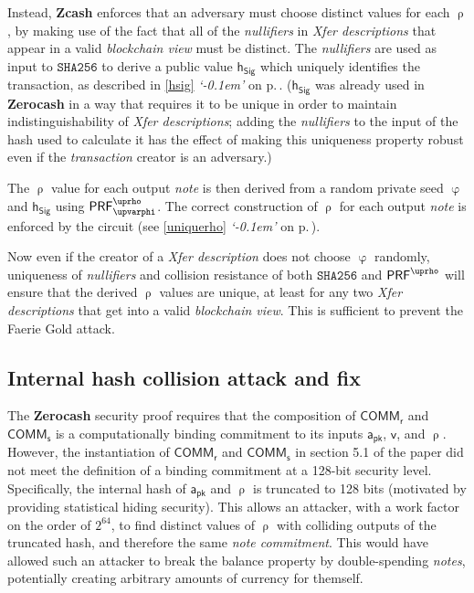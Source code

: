 \documentclass{article}
\newcommand{\crossref}[1]{\autoref{#1} \emph{`\nameref*{#1}\kern -0.1em'} on p.\,\pageref*{#1}}
\newcommand{\term}[1]{\textsl{#1}\xspace}
\newcommand{\termbf}[1]{\textbf{#1}\xspace}
\newcommand{\Zcash}{\termbf{Zcash}}
\newcommand{\Zerocash}{\termbf{Zerocash}}
\newcommand{\coin}{\term{note}}
\newcommand{\coins}{\term{notes}}
\newcommand{\coinCommitment}{\term{note commitment}}
\newcommand{\pourDescription}{\term{Xfer description}}
\newcommand{\pourDescriptions}{\term{Xfer descriptions}}
\newcommand{\transaction}{\term{transaction}}
\newcommand{\blockchainview}{\term{blockchain view}}
\newcommand{\serialNumbers}{\term{nullifiers}}
\newcommand{\FullHash}{\mathtt{SHA256}}
\newcommand{\AuthPublic}{\mathsf{a_{pk}}}
\newcommand{\Value}{\mathsf{v}}
\newcommand{\CoinCommitRand}{\mathsf{r}}
\newcommand{\CoinAddressRand}{\mathsf{\uprho}}
\newcommand{\CoinAddressPreRand}{\mathsf{\upvarphi}}
\newcommand{\CoinCommitS}{\mathsf{s}}
\newcommand{\PRF}[2]{\mathsf{{PRF}^{#2}_\mathnormal{#1}}}
\newcommand{\PRFrho}[1]{\PRF{#1}{\CoinAddressRand}}
\newcommand{\hSig}{\mathsf{h_{Sig}}}
\newcommand{\COMM}[1]{\mathsf{COMM}_{#1}}
\begin{document}
Instead, \Zcash enforces that an adversary must choose distinct values
for each $\CoinAddressRand$, by making use of the fact that all of the
\serialNumbers in \pourDescriptions that appear in a valid \blockchainview
must be distinct. The \serialNumbers are used as input to $\FullHash$
to derive a public value $\hSig$ which uniquely identifies the transaction,
as described in \crossref{hsig}. ($\hSig$ was already used in \Zerocash
in a way that requires it to be unique in order to maintain
indistinguishability of \pourDescriptions; adding the \serialNumbers
to the input of the hash used to calculate it has the effect of making
this uniqueness property robust even if the \transaction creator is an
adversary.)

The $\CoinAddressRand$ value for each output \coin is then derived from
a random private seed $\CoinAddressPreRand$ and $\hSig$ using
$\PRFrho{\CoinAddressPreRand}$. The correct construction of
$\CoinAddressRand$ for each output \coin is enforced by the circuit
(see \crossref{uniquerho}).

Now even if the creator of a \pourDescription does not choose
$\CoinAddressPreRand$ randomly, uniqueness of \serialNumbers and
collision resistance of both $\FullHash$ and $\PRFrho{}$ will ensure
that the derived $\CoinAddressRand$ values are unique, at least for
any two \pourDescriptions that get into a valid \blockchainview.
This is sufficient to prevent the Faerie Gold attack.


\subsection{Internal hash collision attack and fix}

The \Zerocash security proof requires that the composition of
$\COMM{\CoinCommitRand}$ and $\COMM{\CoinCommitS}$ is a computationally
binding commitment to its inputs $\AuthPublic$, $\Value$, and
$\CoinAddressRand$. However, the instantiation of $\COMM{\CoinCommitRand}$
and $\COMM{\CoinCommitS}$ in section 5.1 of the paper did not meet
the definition of a binding commitment at a 128-bit security level.
Specifically, the internal hash of $\AuthPublic$ and $\CoinAddressRand$
is truncated to 128 bits (motivated by providing statistical hiding
security). This allows an attacker, with a work factor on the order of
$2^{64}$, to find distinct values of $\CoinAddressRand$ with colliding
outputs of the truncated hash, and therefore the same \coinCommitment.
This would have allowed such an attacker to break the balance property
by double-spending \coins, potentially creating arbitrary amounts of
currency for themself.
\end{document}
